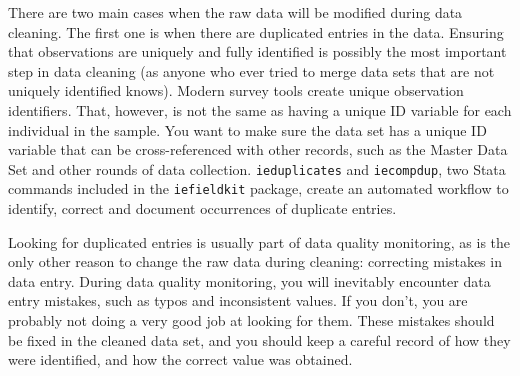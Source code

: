 There are two main cases when the raw data will be modified during data cleaning.
The first one is when there are duplicated entries in the data.
Ensuring that observations are uniquely and fully identified
is possibly the most important step in data cleaning
(as anyone who ever tried to merge data sets that are not uniquely identified knows).
Modern survey tools create unique observation identifiers.
That, however, is not the same as having a unique ID variable for each individual in the sample.
You want to make sure the data set has a unique ID variable
that can be cross-referenced with other records, such as the Master Data Set
and other rounds of data collection.
\texttt{ieduplicates} and \texttt{iecompdup}, 
two Stata commands included in the \texttt{iefieldkit} 
package,
create an automated workflow to identify, correct and document
occurrences of duplicate entries. 

Looking for duplicated entries is usually part of data quality monitoring,
as is the only other reason to change the raw data during cleaning:
correcting mistakes in data entry.
During data quality monitoring, you will inevitably encounter data entry mistakes,
such as typos and inconsistent values.
If you don't, you are probably not doing a very good job at looking for them.
These mistakes should be fixed in the cleaned data set,
and you should keep a careful record of how they were identified,
and how the correct value was obtained.

